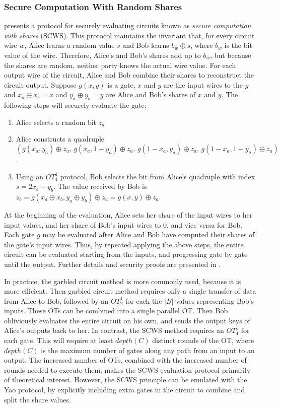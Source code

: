 \subsubsection{Secure Computation With Random Shares}

\cite{GMW87} presents a protocol for securely evaluating circuits
known as \emph{secure computation with shares} (SCWS). This protocol
maintains the invariant that, for every circuit wire $w$, Alice learns
a random value $s$ and Bob learns $b_{w}\oplus s$, where $b_{w}$
is the bit value of the wire. Therefore, Alice's and Bob's shares
add up to $b_{w}$, but because the shares are random, neither party
knows the actual wire value. For each output wire of the circuit,
Alice and Bob combine their shares to reconstruct the circuit output.
Suppose $g(x,y)$ is a gate, $x$ and $y$ are the input wires to
the $g$ and $x_{a}\oplus x_{b}=x$ and $y_{a}\oplus y_{b}=y$ are
Alice and Bob's shares of $x$ and $y$. The following steps will
securely evaluate the gate:
\begin{enumerate}
\item Alice selects a random bit $z_{a}$ 
\item Alice constructs a quadruple $\left(g(x_{a},y_{a})\oplus z_{a},\, g(x_{a},1-y_{a})\oplus z_{a},\, g(1-x_{a},y_{a})\oplus z_{a},\, g(1-x_{a},1-y_{a})\oplus z_{a}\right)$. 
\item Using an $OT_{4}^{1}$ protocol, Bob selects the bit from Alice's
quadruple with index $s=2x_{b}+y_{b}$. The value received by Bob
is $z_{b}=g(x_{a}\oplus x_{b},y_{a}\oplus y_{b})\oplus z_{a}=g(x,y)\oplus z_{a}$. 
\end{enumerate}
At the beginning of the evaluation, Alice sets her share of the input
wires to her input values, and her share of Bob's input wires to $0$,
and vice versa for Bob. Each gate $g$ may be evaluated after Alice
and Bob have computed their shares of the gate's input wires. Thus,
by repeated applying the above steps, the entire circuit can be evaluated
starting from the inputs, and progressing gate by gate until the output.
Further details and security proofs are presented in \cite{Goldreich:vol2}.

In practice, the garbled circuit method is more commonly used, because
it is more efficient. Then garbled circuit method requires only a
single transfer of data from Alice to Bob, followed by an $OT_{2}^{1}$
for each the $|B|$ values representing Bob's inputs. These OTs can
be combined into a single parallel OT. Then Bob obliviously evaluates
the entire circuit on his own, and sends the output keys of Alice's
outputs back to her. In contrast, the SCWS method requires an $OT_{4}^{1}$
for each gate. This will require at least $depth(C)$ distinct rounds
of the OT, where $depth(C)$ is the maximum number of gates along
any path from an input to an output. The increased number of OTs,
combined with the increased number of rounds needed to execute them,
makes the SCWS evaluation protocol primarily of theoretical interest.
However, the SCWS principle can be emulated with the Yao protocol,
by explicitly including extra gates in the circuit to combine and
split the share values. 


